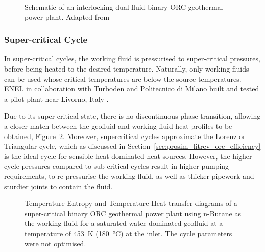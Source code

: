             \begin{figure}[H]
                \centering
                
                \caption[Schematic of an interlocking dual fluid binary ORC geothermal power plant.]{Schematic of an interlocking dual fluid binary ORC geothermal power plant. Adapted from \cite{DiPippo2016}}
                \label{fig:litrev_ORC_dualFluid_interlocl_schematic}
            \end{figure}
           
        \subsubsection{Super-critical Cycle}
            In super-critical cycles, the working fluid is pressurised to super-critical pressures, before being heated to the desired temperature. Naturally, only working fluids can be used whose critical temperatures are below the source temperatures. ENEL in collaboration with Turboden and Politecnico di Milano built and tested a pilot plant near Livorno, Italy \cite{Astolfi2013}.
            
            Due to its super-critical state, there is no discontinuous phase transition, allowing a closer match between the geofluid and working fluid heat profiles to be obtained, Figure~\ref{fig:litrev_ORC_supercrit_TS}. Moreover, supercritical cycles approximate the Lorenz or Triangular cycle, which as discussed in Section~\ref{sec:prosim_litrev_orc_efficiency} is the ideal cycle for sensible heat dominated heat sources. However, the higher cycle pressures compared to sub-critical cycles result in higher pumping requirements, to re-pressurise the working fluid, as well as thicker pipework and sturdier joints to contain the fluid. 

             \begin{figure}[H]
                \centering
                
                \caption[TS and TQ diagrams of a super-critical binary \ac{ORC} geothermal power plant using n-Butane as the working fluid.]{Temperature-Entropy and Temperature-Heat transfer diagrams of a super-critical binary \ac{ORC} geothermal power plant using n-Butane as the working fluid for a saturated water-dominated geofluid at a temperature of \qty{453}{\K} (\qty{180}{\degreeCelsius}) at the inlet. The cycle parameters were not optimised.}
                \label{fig:litrev_ORC_supercrit_TS}
            \end{figure}
            

